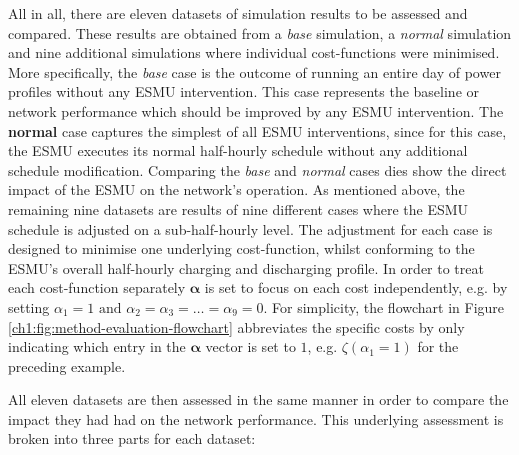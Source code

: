 

All in all, there are eleven datasets of simulation results to be assessed and compared.
These results are obtained from a \textit{base} simulation, a \textit{normal} simulation and nine additional simulations where individual cost-functions were minimised.
More specifically, the \textit{base} case is the outcome of running an entire day of power profiles without any ESMU intervention.
This case represents the baseline or network performance which should be improved by any ESMU intervention.
The \textbf{normal} case captures the simplest of all ESMU interventions, since for this case, the ESMU executes its normal half-hourly schedule without any additional schedule modification.
Comparing the \textit{base} and \textit{normal} cases dies show the direct impact of the ESMU on the network's operation.
As mentioned above, the remaining nine datasets are results of nine different cases where the ESMU schedule is adjusted on a sub-half-hourly level.
The adjustment for each case is designed to minimise one underlying cost-function, whilst conforming to the ESMU's overall half-hourly charging and discharging profile.
In order to treat each cost-function separately $\boldsymbol{\alpha}$ is set to focus on each cost independently, e.g. by setting $\alpha_1 = 1 \text{ and } \alpha_2 = \alpha_3 = \dots = \alpha_9 = 0$.
For simplicity, the flowchart in Figure \ref{ch1:fig:method-evaluation-flowchart} abbreviates the specific costs by only indicating which entry in the $\boldsymbol{\alpha}$ vector is set to $1$, e.g. $\zeta(\alpha_1=1)$ for the preceding example.

All eleven datasets are then assessed in the same manner in order to compare the impact they had had on the network performance.
This underlying assessment is broken into three parts for each dataset:

